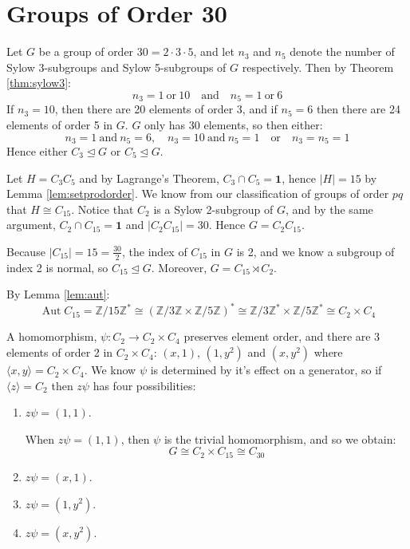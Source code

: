 \documentclass[a4paper, oneside, 12pt, final]{article}
\theoremstyle{definition}
\DeclareMathOperator{\Aut}{Aut}
\newcommand{\Z}{\mathbb{Z}}
\newcommand{\Zn}[1]{\Z/#1\Z}
\begin{document}

\section{Groups of Order 30}
Let \(G\) be a group of order \(30 = 2 \cdot 3 \cdot 5\), and let \(n_3\) and \(n_5\) denote the number of Sylow 3-subgroups and Sylow 5-subgroups of \(G\) respectively.
Then by Theorem \ref{thm:sylow3}:
\[n_3 = 1 \ \text{or} \ 10 \quad \text{and} \quad n_5 = 1 \ \text{or} \ 6\]
If \(n_3 = 10\), then there are 20 elements of order 3, and if \(n_5 = 6\) then there are 24 elements of order 5 in \(G\).
\(G\) only has 30 elements, so then either:
\[n_3 = 1 \ \text{and} \ n_5 = 6, \quad n_3 = 10 \ \text{and} \ n_5 = 1 \quad \text{or} \quad n_3 = n_5 = 1\]
Hence either \(C_3 \unlhd G\) or \(C_5 \unlhd G\).

Let \(H = C_3C_5\) and by Lagrange's Theorem, \(C_3 \cap C_5 = \bm{1}\), hence \(|H| = 15\) by Lemma \ref{lem:setprodorder}.
We know from our classification of groups of order \(pq\) that \(H \cong C_{15}\).
Notice that \(C_2\) is a Sylow 2-subgroup of \(G\), and by the same argument, \(C_2 \cap C_{15} = \bm{1}\) and \(|C_2C_{15}| = 30\).
Hence \(G = C_2C_{15}\).

Because \(|C_{15}| = 15 = \frac{30}{2}\), the index of \(C_{15}\) in \(G\) is 2, and we know a subgroup of index 2 is normal, so \(C_{15} \unlhd G\).
Moreover, \(G = C_{15} \rtimes C_2\).

By Lemma \ref{lem:aut}:
\[\Aut{C_{15}} = \Zn{15}^* \cong (\Zn{3} \times \Zn{5})^* \cong \Zn{3}^* \times \Zn{5}^* \cong C_2 \times C_4\]

A homomorphism, \(\psi:C_2 \to C_2 \times C_4\) preserves element order, and there are 3 elements of order 2 in \(C_2 \times C_4\): \((x, 1)\), \((1, y^2)\) and \((x, y^2)\) where \(\langle x, y \rangle = C_2 \times C_4\).
We know \(\psi\) is determined by it's effect on a generator, so if \(\langle z \rangle = C_2\) then \(z\psi\) has four possibilities:

\begin{enumerate}
    \item \(z\psi = (1, 1)\).

        When \(z\psi = (1, 1)\), then \(\psi\) is the trivial homomorphism, and so we obtain:
        \[G \cong C_2 \times C_{15} \cong C_{30}\]

    \item \(z\psi = (x, 1)\).
    \item \(z\psi = (1, y^2)\).
    \item \(z\psi = (x, y^2)\).
\end{enumerate}
\end{document}
